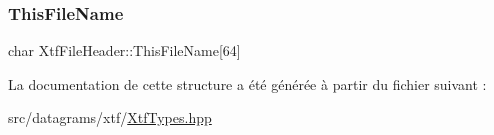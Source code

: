 \subsubsection{\texorpdfstring{This\+File\+Name}{ThisFileName}}
{\footnotesize\ttfamily char Xtf\+File\+Header\+::\+This\+File\+Name\mbox{[}64\mbox{]}}



La documentation de cette structure a été générée à partir du fichier suivant \+:\begin{DoxyCompactItemize}
\item 
src/datagrams/xtf/\hyperlink{XtfTypes_8hpp}{Xtf\+Types.\+hpp}\end{DoxyCompactItemize}
